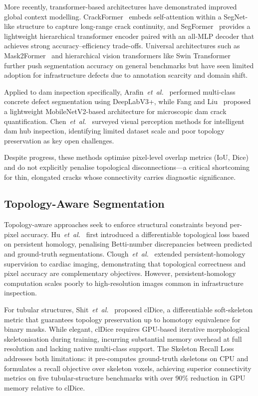 More recently, transformer-based architectures have demonstrated improved global context modelling.
CrackFormer~\cite{liu2021crackformer} embeds self-attention within a SegNet-like structure to capture long-range crack continuity, and SegFormer~\cite{xie2021segformer} provides a lightweight hierarchical transformer encoder paired with an all-MLP decoder that achieves strong accuracy--efficiency trade-offs.
Universal architectures such as Mask2Former~\cite{cheng2022mask2former} and hierarchical vision transformers like Swin Transformer~\cite{liu2021swin} further push segmentation accuracy on general benchmarks but have seen limited adoption for infrastructure defects due to annotation scarcity and domain shift.

Applied to dam inspection specifically, Arafin~\emph{et~al.}~\cite{arafin2024concrete} performed multi-class concrete defect segmentation using DeepLabV3+, while Fang and Liu~\cite{fang2024dam} proposed a lightweight MobileNetV2-based architecture for microscopic dam crack quantification.
Chen~\emph{et~al.}~\cite{chen2024damsurvey} surveyed visual perception methods for intelligent dam hub inspection, identifying limited dataset scale and poor topology preservation as key open challenges.

Despite progress, these methods optimise pixel-level overlap metrics (IoU, Dice) and do not explicitly penalise topological disconnections---a critical shortcoming for thin, elongated cracks whose connectivity carries diagnostic significance.

\subsection{Topology-Aware Segmentation}
\label{sec:related:topology}

Topology-aware approaches seek to enforce structural constraints beyond per-pixel accuracy.
Hu~\emph{et~al.}~\cite{hu2019topology} first introduced a differentiable topological loss based on persistent homology, penalising Betti-number discrepancies between predicted and ground-truth segmentations.
Clough~\emph{et~al.}~\cite{clough2020topological} extended persistent-homology supervision to cardiac imaging, demonstrating that topological correctness and pixel accuracy are complementary objectives.
However, persistent-homology computation scales poorly to high-resolution images common in infrastructure inspection.

For tubular structures, Shit~\emph{et~al.}~\cite{shit2021cldice} proposed clDice, a differentiable soft-skeleton metric that guarantees topology preservation up to homotopy equivalence for binary masks.
While elegant, clDice requires GPU-based iterative morphological skeletonisation during training, incurring substantial memory overhead at full resolution and lacking native multi-class support.
The Skeleton Recall Loss~\cite{shit2024skeleton} addresses both limitations: it pre-computes ground-truth skeletons on CPU and formulates a recall objective over skeleton voxels, achieving superior connectivity metrics on five tubular-structure benchmarks with over 90\% reduction in GPU memory relative to clDice.

